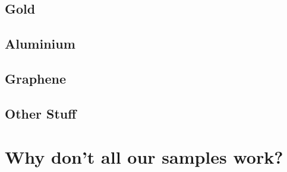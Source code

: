 \subsection{Gold}

\subsection{Aluminium}

\subsection{Graphene}

\subsection{Other Stuff}

\section{Why don't all our samples work?}
